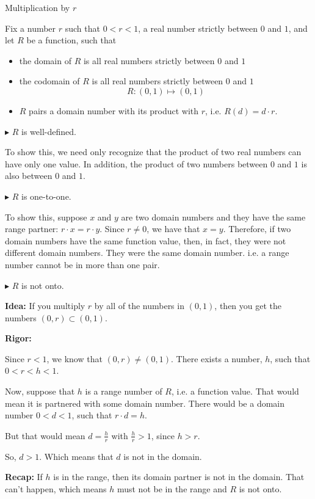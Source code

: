 \documentclass{ximera}
\begin{document}
\begin{example} Multiplication by $r$ 



Fix a number $r$ such that $0 < r < 1$, a real number strictly between $0$ and $1$, and let $R$ be a function, such that

\begin{itemize}
\item the domain of $R$ is all real numbers strictly between $0$ and $1$  
\item the codomain of $R$ is all real numbers strictly between $0$ and $1$  
\[
R : (0,1) \mapsto (0,1)
\]
\item $R$ pairs a domain number with its product with $r$, i.e. $R(d) = d \cdot r$.
\end{itemize}





$\blacktriangleright$ $R$ is well-defined.  

To show this, we need only recognize that the product of two real numbers can have only one value.  In addition, the product of two numbers between $0$ and $1$ is also between $0$ and $1$.  


$\blacktriangleright$ $R$ is one-to-one. 

To show this, suppose $x$ and $y$ are two domain numbers and they have the same range partner: $r \cdot x = r \cdot y$.  Since $r \ne 0$, we have that $x = y$. Therefore, if two domain numbers have the same function value, then, in fact, they were not different domain numbers.  They were the same domain number. i.e. a range number cannot be in more than one pair.


$\blacktriangleright$ $R$ is not onto.

\textbf{Idea:} If you multiply $r$ by all of the numbers in $(0,1)$, then you get the numbers $(0,r) \subset (0, 1)$.


\textbf{Rigor:}

Since $r < 1$, we know that  $(0,r) \ne (0, 1)$. There exists a number, $h$, such that $0 < r < h < 1$.  

Now, suppose that $h$ is a range number of $R$, i.e. a function value. That would mean it is partnered with some domain number.  There would be a domain number $0 < d < 1$, such that  $r \cdot d = h$.  


But that would mean $d = \frac{h}{r}$ with $\frac{h}{r} > 1$, since $h > r$.  

So, $d > 1$.  Which means that $d$ is not in the domain.

\textbf{Recap:} If $h$ is in the range, then its domain partner is not in the domain.  That can't happen, which means $h$ must not be in the range and $R$ is not onto.




\end{example} 
\end{document}
